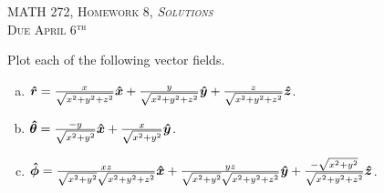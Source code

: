 \documentclass[12pt]{article} %
\newcommand{\rhat}{\boldsymbol{\hat{r}}}
\newcommand{\thetahat}{\boldsymbol{\hat{\theta}}}
\newcommand{\phihat}{\boldsymbol{\hat{\phi}}}
\begin{document}
\begin{center}
   \textsc{\large MATH 272, Homework 8, \emph{Solutions}}\\
   \textsc{Due April 6$^\textrm{th}$}
\end{center}
\vspace{.5cm}

\begin{problem}
    Plot each of the following vector fields.
    \begin{enumerate}[(a)]
        \item $\rhat = \frac{x}{\sqrt{x^2+y^2+z^2}}\xhat + \frac{y}{\sqrt{x^2+y^2+z^2}}\yhat+\frac{z}{\sqrt{x^2+y^2+z^2}}\zhat$.
        \item $\thetahat = \frac{-y}{\sqrt{x^2+y^2}}\xhat + \frac{x}{\sqrt{x^2+y^2}}\yhat$.
        \item $\phihat = \frac{xz}{\sqrt{x^2+y^2}\sqrt{x^2+y^2+z^2}}\xhat + \frac{yz}{\sqrt{x^2+y^2}\sqrt{x^2+y^2+z^2}}\yhat+\frac{-\sqrt{x^2+y^2}}{\sqrt{x^2+y^2+z^2}}\zhat$.
    \end{enumerate}
\end{problem}
\end{document}
